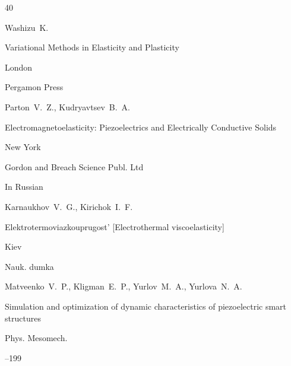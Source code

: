 \begin{thebibliography}{40}








\by Washizu~K.

\book Variational Methods in Elasticity and Plasticity

\publaddr London

\publ Pergamon Press






\by Parton~V.~Z., Kudryavtsev~B.~A.

\book Electromagnetoelasticity: Piezoelectrics and Electrically Conductive Solids

\publaddr New York

\publ Gordon and Breach Science Publ. Ltd






\lang In Russian

\by Karnaukhov~V.~G., Kirichok~I.~F.

\book Elektrotermoviazkouprugost' \rm [Electrothermal viscoelasticity]

\publaddr Kiev

\publ Nauk. dumka








\by Matveenko~V.~P., Kligman~E.~P., Yurlov~M.~A., Yurlova~N.~A.

\paper  Simulation and optimization of dynamic characteristics of piezoelectric smart structures

\jour Phys. Mesomech.




–199





\end{thebibliography}
